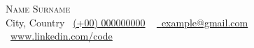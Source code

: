 
    {\Huge \scshape Name Surname} \\ \vspace{7pt}
    \faMapMarked* City, Country 
    \small \raisebox{-0.1\height}\faPhone\ \href{tel:00000000000}{(+00) 000000000} ~ \href{mailto:example@gmail.com}{\raisebox{-0.2\height}\faEnvelope\  {example@gmail.com}} ~ 
    \\ \vspace{3pt}
    \small \raisebox{-0.1\height}\faLinkedinIn\ \href{https://www.linkedin.com/in/code/}{www.linkedin.com/code}
    \vspace{6pt}
